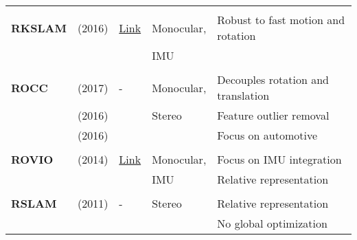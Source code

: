 \documentclass[a4paper,12pt]{scrartcl}
\begin{document}
{\begin{longtable}{l|l|l|l|l}
                           &                                   &                                                                    &                       &\\
    \textbf{RKSLAM}        & \cite{Liu2016} (2016)             & {\href{https://zjucvg.net/rkslam/rkslam.html}{Link}}               & Monocular,            & Robust to fast motion and rotation\\
                           &                                   &                                                                    & IMU                   &\\
                           &                                   &                                                                    &                       &\\
    \textbf{ROCC}          & \cite{Buczko2017} (2017)          & -                                                                  & Monocular,            & Decouples rotation and translation\\
                           & \cite{Buczko2016} (2016)          &                                                                    & Stereo                & Feature outlier removal\\
                           & \cite{Buczko2016a} (2016)         &                                                                    &                       & Focus on automotive\\
                           &                                   &                                                                    &                       &\\
    \textbf{ROVIO}         & \cite{Bloesch2015} (2014)         & {\href{https://github.com/ethz-asl/rovio}{Link}}                   & Monocular,            & Focus on IMU integration\\
                           &                                   &                                                                    & IMU                   & Relative representation\\
                           &                                   &                                                                    &                       &\\
    \textbf{RSLAM}         & \cite{Mei2011} (2011)             & -                                                                  & Stereo                & Relative representation\\
                           &                                   &                                                                    &                       & No global optimization \\

\end{longtable}}
\end{document}
